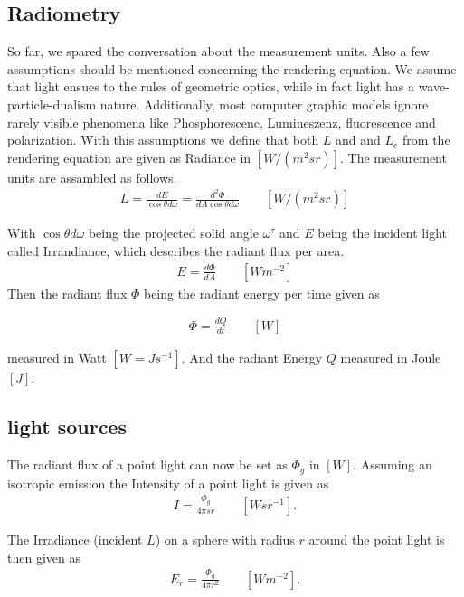 \subsection{Radiometry}


So far, we spared the conversation about the measurement units. Also a few assumptions should be mentioned concerning the rendering equation. We assume that light ensues to the rules of geometric optics, while in fact light has a wave-particle-dualism nature. Additionally, most computer graphic models ignore rarely visible phenomena like Phosphorescenc, Lumineszenz, fluorescence and polarization. With this assumptions we define that both $L$ and and $L_e$ from the rendering equation are given as Radiance in $[W / (m^2sr)]$. The measurement units are assambled as follows.
\begin{align}
L = \frac{dE}{\cos \theta d\omega} = \frac{d^2\Phi}{dA\cos \theta d\omega} \qquad [W / (m^2 sr) ]
\end{align}


With $\cos \theta d\omega$ being the projected solid angle $\omega^\tau$ and $E$ being the incident light called Irrandiance, which describes the radiant flux per area.
\begin{align}
E = \frac{ d\Phi }{ dA } \qquad [W m^{-2} ]
\end{align}
Then the radiant flux $\Phi$ being the radiant energy per time given as

\begin{align}
 \Phi = \frac{dQ}{dt} \qquad [W]   
\end{align}

measured in Watt $[W = Js^{-1} ]$. And the radiant Energy $Q$ measured in Joule $[J]$.

\subsection{light sources}


The radiant flux of a point light can now be set as $\Phi_g$ in $[W]$. Assuming an isotropic emission the Intensity of a point light is given as
\begin{align}
 I = \frac{\Phi_g}{4\pi sr} \qquad [ W sr^{-1} ] .
\end{align}

The Irradiance (incident $L$) on a sphere with radius $r$ around the point light is then given as
\begin{align}
E_r =  \frac{\Phi_g}{4\pi r^2} \qquad [ W m^{-2} ] .
\end{align}

